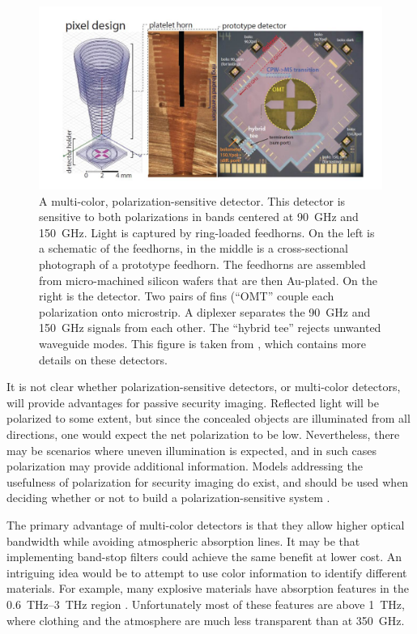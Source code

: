 \begin{figure}
\centering
\includegraphics[width=\textwidth]{images/ch9-multi-chroic.jpg}
\caption[Multi-color, polarization-sensitive detectors]{
  A multi-color, polarization-sensitive detector.
  This detector is sensitive to both polarizations in bands centered at \SI{90}{\GHz} and \SI{150}{\GHz}.
  Light is captured by ring-loaded feedhorns.
  On the left is a schematic of the feedhorns, in the middle is a cross-sectional photograph of a prototype feedhorn.
  The feedhorns are assembled from micro-machined silicon wafers that are then Au-plated.
  On the right is the detector.
  Two pairs of fins (``OMT'' couple each polarization onto microstrip.
  A diplexer separates the \SI{90}{\GHz} and \SI{150}{\GHz} signals from each other.
  The ``hybrid tee'' rejects unwanted waveguide modes.
  This figure is taken from \cite{datta_horn_2014}, which contains more details on these detectors.
}
\label{fig:ch9-multi-chroic}
\end{figure}

It is not clear whether polarization-sensitive detectors, or multi-color detectors, will provide advantages for passive security imaging.
Reflected light will be polarized to some extent, but since the concealed objects are illuminated from all directions, one would expect the net polarization to be low.
Nevertheless, there may be scenarios where uneven illumination is expected, and in such cases polarization may provide additional information.
Models addressing the usefulness of polarization for security imaging do exist, and should be used when deciding whether or not to build a polarization-sensitive system \cite{salmon_polarimetric_2004}.

The primary advantage of multi-color detectors is that they allow higher optical bandwidth while avoiding atmospheric absorption lines.
It may be that implementing band-stop filters could achieve the same benefit at lower cost.
An intriguing idea would be to attempt to use color information to identify different materials.
For example, many explosive materials have absorption features in the \SIrange{0.6}{3}{\THz} region \cite{federici_thz_2005,davies_terahertz_2008}.
Unfortunately most of these features are above \SI{1}{\THz}, where clothing and the atmosphere are much less transparent than at \SI{350}{\GHz}.

